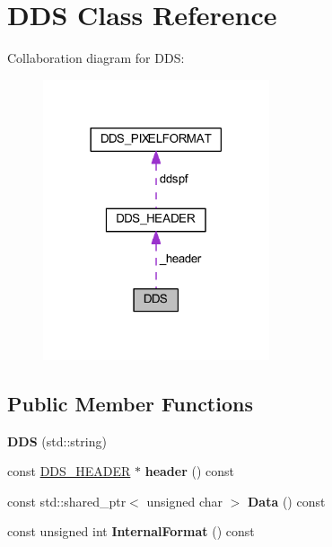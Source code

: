 \hypertarget{class_d_d_s}{}\section{D\+DS Class Reference}
\label{class_d_d_s}


Collaboration diagram for D\+DS\+:
\nopagebreak
\begin{figure}[H]
\begin{center}
\leavevmode
\includegraphics[width=189pt]{class_d_d_s__coll__graph}
\end{center}
\end{figure}
\subsection*{Public Member Functions}
\begin{DoxyCompactItemize}
\item 
{\bfseries D\+DS} (std\+::string)\hypertarget{class_d_d_s_ac5ac976521bebdef668de3e1cf77e279}{}\label{class_d_d_s_ac5ac976521bebdef668de3e1cf77e279}

\item 
const \hyperlink{struct_d_d_s___h_e_a_d_e_r}{D\+D\+S\+\_\+\+H\+E\+A\+D\+ER} $\ast$ {\bfseries header} () const \hypertarget{class_d_d_s_a7bac3c01274736d1a5fc85c807312f6b}{}\label{class_d_d_s_a7bac3c01274736d1a5fc85c807312f6b}

\item 
const std\+::shared\+\_\+ptr$<$ unsigned char $>$ {\bfseries Data} () const \hypertarget{class_d_d_s_a4cc8e7e708642b15b10ad5f9694a742c}{}\label{class_d_d_s_a4cc8e7e708642b15b10ad5f9694a742c}

\item 
const unsigned int {\bfseries Internal\+Format} () const \hypertarget{class_d_d_s_a958175f74602a608bc71e2928ec135fa}{}\label{class_d_d_s_a958175f74602a608bc71e2928ec135fa}

\end{DoxyCompactItemize}
